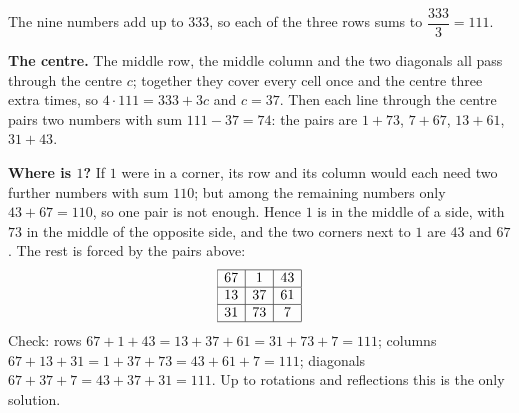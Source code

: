 The nine numbers add up to $333$, so each of the three rows sums to $\dfrac{333}{3}=111$.

\textbf{The centre.} The middle row, the middle column and the two diagonals all pass through the centre $c$; together they cover every cell once and the centre three extra times, so $4\cdot111=333+3c$ and $c=37$. Then each line through the centre pairs two numbers with sum $111-37=74$: the pairs are $1+73$, $7+67$, $13+61$, $31+43$.

\textbf{Where is $1$?} If $1$ were in a corner, its row and its column would each need two further numbers with sum $110$; but among the remaining numbers only $43+67=110$, so one pair is not enough. Hence $1$ is in the middle of a side, with $73$ in the middle of the opposite side, and the two corners next to $1$ are $43$ and $67$. The rest is forced by the pairs above:
\[\begin{array}{|c|c|c|}\hline 67&1&43\\\hline 13&37&61\\\hline 31&73&7\\\hline\end{array}\]
Check: rows $67+1+43=13+37+61=31+73+7=111$; columns $67+13+31=1+37+73=43+61+7=111$; diagonals $67+37+7=43+37+31=111$. Up to rotations and reflections this is the only solution.
